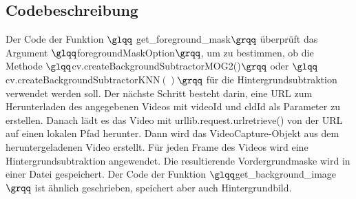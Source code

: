 \documentclass[12pt]{scrartcl}
\begin{document}
\subsection{Codebeschreibung}
Der Code der Funktion $\glqq$ get\_foreground\_mask$\grqq$ \"uberpr\"uft das Argument $\glqq$foregroundMaskOption$\grqq$, um zu bestimmen, ob die Methode $\glqq$cv.createBackgroundSubtractorMOG2()$\grqq$ oder $\glqq$cv.createBackgroundSubtractorKNN$()$$\grqq$ f\"ur die Hintergrundsubtraktion verwendet werden soll. Der n\"achste Schritt besteht darin, eine URL zum Herunterladen des angegebenen Videos mit videoId und cldId als Parameter zu erstellen. Danach l\"adt es das Video mit urllib.request.urlretrieve() von der URL auf einen lokalen Pfad herunter. Dann wird das VideoCapture-Objekt aus dem heruntergeladenen Video erstellt. F\"ur jeden Frame des Videos wird eine Hintergrundsubtraktion angewendet. Die resultierende Vordergrundmaske wird in einer Datei gespeichert.
Der Code der Funktion $\glqq$get\_background\_image$\grqq$ ist \"ahnlich geschrieben, speichert aber auch Hintergrundbild.\\
\end{document}
